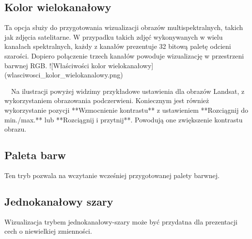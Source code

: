 \documentclass[12pt,a4paper]{book}
\begin{document}
\subsection{Kolor wielokanałowy}
Ta opcja służy do przygotowania wizualizacji obrazów multispektralnych, takich jak zdjęcia satelitarne. W przypadku takich zdjęć wykonywanych w wielu kanałach spektralnych, każdy z kanałów prezentuje 32 bitową paletę odcieni szarości. Dopiero połączenie trzech kanałów powoduje wizualizację w przestrzeni barwnej RGB. ![Właściwości kolor wielokanałowy] (wlasciwosci\_kolor\_wielokanalowy.png)

\ \ Na ilustracji powyżej widzimy przykładowe ustawienia dla obrazów Landsat, z wykorzystaniem obrazowania podczerwieni. Koniecznym jest również wykorzystanie pozycji **Wzmocnienie kontrastu** z ustawieniem **Rozciągnij do min./max.** lub **Rozciągnij i przytnij**. Powodują one zwiększenie kontrastu obrazu.

\subsection{Paleta barw}
Ten tryb pozwala na wczytanie wcześniej przygotowanej palety barwnej.

\subsection{Jednokanałowy szary}
Wizualizacja trybem jednokanałowy-szary może być przydatna dla prezentacji cech o niewielkiej zmienności.
\end{document}
